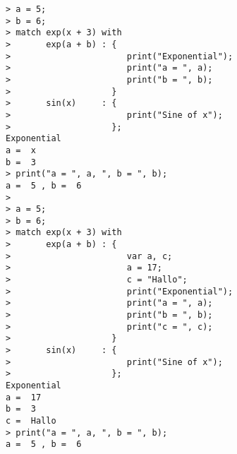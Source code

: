 \begin{center}\begin{minipage}{15cm}\begin{Verbatim}[frame=single]
> a = 5;
> b = 6;
> match exp(x + 3) with 
>       exp(a + b) : {
>                       print("Exponential");
>                       print("a = ", a);
>                       print("b = ", b);
>                    }
>       sin(x)     : {
>                       print("Sine of x");
>                    };
Exponential
a =  x
b =  3
> print("a = ", a, ", b = ", b);
a =  5 , b =  6
> 
> a = 5;
> b = 6;
> match exp(x + 3) with 
>       exp(a + b) : {
>                       var a, c;
>                       a = 17;
>                       c = "Hallo";
>                       print("Exponential");
>                       print("a = ", a);
>                       print("b = ", b);
>                       print("c = ", c);
>                    }
>       sin(x)     : {
>                       print("Sine of x");
>                    };
Exponential
a =  17
b =  3
c =  Hallo
> print("a = ", a, ", b = ", b);
a =  5 , b =  6
\end{Verbatim}
\end{minipage}\end{center}
